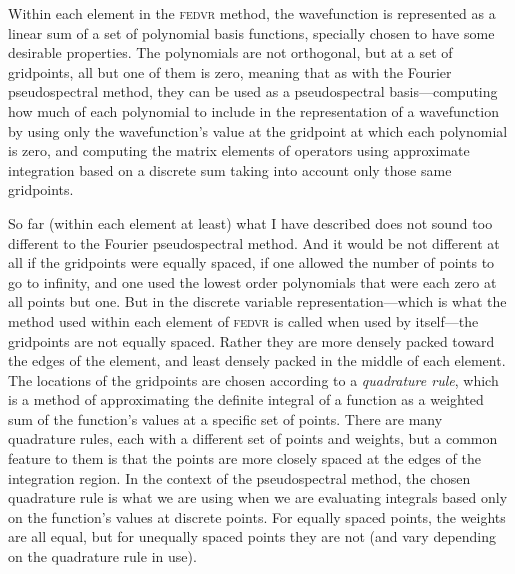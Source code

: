 Within each element in the \textsc{fedvr} method, the wavefunction is represented as a linear sum of a set of polynomial basis functions, specially chosen to have some desirable properties. The polynomials are not orthogonal, but at a set of gridpoints, all but one of them is zero, meaning that as with the Fourier pseudospectral method, they can be used as a pseudospectral basis---computing how much of each polynomial to include in the representation of a wavefunction by using only the wavefunction's value at the gridpoint at which each polynomial is zero, and computing the matrix elements of operators using approximate integration based on a discrete sum taking into account only those same gridpoints.

So far (within each element at least) what I have described does not sound too different to the Fourier pseudospectral method. And it would be not different at all if the gridpoints were equally spaced, if one allowed the number of points to go to infinity, and one used the lowest order polynomials that were each zero at all points but one. But in the discrete variable representation---which is what the method used within each element of \textsc{fedvr} is called when used by itself---the gridpoints are not equally spaced. Rather they are more densely packed toward the edges of the element, and least densely packed in the middle of each element. The locations of the gridpoints are chosen according to a \emph{quadrature rule}, which is a method of approximating the definite integral of a function as a  weighted sum of the function's values at a specific set of points. There are many quadrature rules, each with a different set of points and weights, but a common feature to them is that the points are more closely spaced at the edges of the integration region. In the context of the pseudospectral method, the chosen quadrature rule is what we are using when we are evaluating integrals based only on the function's values at discrete points. For equally spaced points, the weights are all equal, but for unequally spaced points they are not (and vary depending on the quadrature rule in use).

